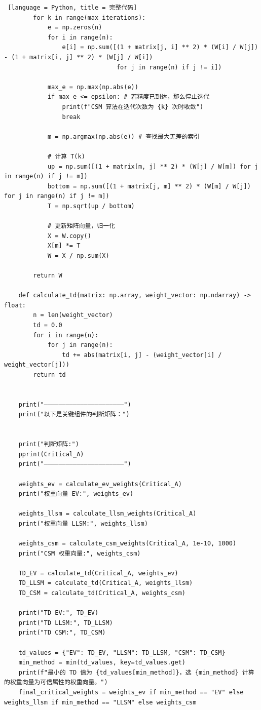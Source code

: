 \documentclass[14pt,a4paper,UTF8,twoside]{article}
\begin{document}
\begin{lstlisting} [language = Python, title = 完整代码]
        for k in range(max_iterations):
            e = np.zeros(n)
            for i in range(n):
                e[i] = np.sum([(1 + matrix[j, i] ** 2) * (W[i] / W[j]) - (1 + matrix[i, j] ** 2) * (W[j] / W[i])
                               for j in range(n) if j != i])
    
            max_e = np.max(np.abs(e))
            if max_e <= epsilon: # 若精度已到达，那么停止迭代
                print(f"CSM 算法在迭代次数为 {k} 次时收敛")
                break
    
            m = np.argmax(np.abs(e)) # 查找最大无差的索引
    
            # 计算 T(k)
            up = np.sum([(1 + matrix[m, j] ** 2) * (W[j] / W[m]) for j in range(n) if j != m])
            bottom = np.sum([(1 + matrix[j, m] ** 2) * (W[m] / W[j]) for j in range(n) if j != m])
            T = np.sqrt(up / bottom)
    
            # 更新矩阵向量，归一化
            X = W.copy()
            X[m] *= T
            W = X / np.sum(X)
    
        return W
    
    def calculate_td(matrix: np.array, weight_vector: np.ndarray) -> float:
        n = len(weight_vector)
        td = 0.0
        for i in range(n):
            for j in range(n):
                td += abs(matrix[i, j] - (weight_vector[i] / weight_vector[j]))
        return td
    
    
    print("——————————————————————")
    print("以下是关键组件的判断矩阵：")
    
    
    print("判断矩阵:")
    pprint(Critical_A)
    print("——————————————————————")
    
    weights_ev = calculate_ev_weights(Critical_A)
    print("权重向量 EV:", weights_ev)
    
    weights_llsm = calculate_llsm_weights(Critical_A)
    print("权重向量 LLSM:", weights_llsm)
    
    weights_csm = calculate_csm_weights(Critical_A, 1e-10, 1000)
    print("CSM 权重向量:", weights_csm)
    
    TD_EV = calculate_td(Critical_A, weights_ev)
    TD_LLSM = calculate_td(Critical_A, weights_llsm)
    TD_CSM = calculate_td(Critical_A, weights_csm)
    
    print("TD EV:", TD_EV)
    print("TD LLSM:", TD_LLSM)
    print("TD CSM:", TD_CSM)
    
    td_values = {"EV": TD_EV, "LLSM": TD_LLSM, "CSM": TD_CSM}
    min_method = min(td_values, key=td_values.get)
    print(f"最小的 TD 值为 {td_values[min_method]}，选 {min_method} 计算的权重向量为可信属性的权重向量。")
    final_critical_weights = weights_ev if min_method == "EV" else weights_llsm if min_method == "LLSM" else weights_csm
    

\end{lstlisting}
\end{document}
